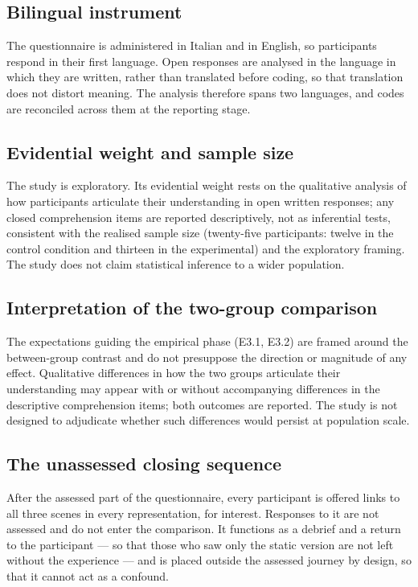 \subsection*{Bilingual instrument}
The questionnaire is administered in Italian and in English, so participants respond in their first language. Open responses are analysed in the language in which they are written, rather than translated before coding, so that translation does not distort meaning. The analysis therefore spans two languages, and codes are reconciled across them at the reporting stage.

\subsection*{Evidential weight and sample size}
The study is exploratory. Its evidential weight rests on the qualitative analysis of how participants articulate their understanding in open written responses; any closed comprehension items are reported descriptively, not as inferential tests, consistent with the realised sample size (twenty-five participants: twelve in the control condition and thirteen in the experimental) and the exploratory framing. The study does not claim statistical inference to a wider population.

\subsection*{Interpretation of the two-group comparison}
The expectations guiding the empirical phase (E3.1, E3.2) are framed around the between-group contrast and do not presuppose the direction or magnitude of any effect. Qualitative differences in how the two groups articulate their understanding may appear with or without accompanying differences in the descriptive comprehension items; both outcomes are reported. The study is not designed to adjudicate whether such differences would persist at population scale.

\subsection*{The unassessed closing sequence}
After the assessed part of the questionnaire, every participant is offered links to all three scenes in every representation, for interest. Responses to it are not assessed and do not enter the comparison. It functions as a debrief and a return to the participant --- so that those who saw only the static version are not left without the experience --- and is placed outside the assessed journey by design, so that it cannot act as a confound.

